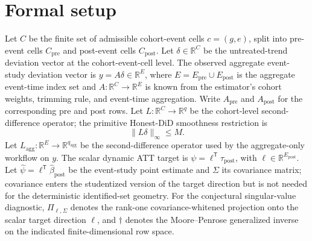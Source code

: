 \documentclass[11pt]{article}
\newcommand{\transpose}{\mathsf{T}}
\newcommand{\R}{\mathbb{R}}
\theoremstyle{definition}
\theoremstyle{plain}
\theoremstyle{remark}
\begin{document}
\section{Formal setup}
Let \(C\) be the finite set of admissible cohort-event cells \(c=(g,e)\), split into pre-event cells \(C_{\mathrm{pre}}\) and post-event cells \(C_{\mathrm{post}}\).
Let \(\delta\in\R^{C}\) be the untreated-trend deviation vector at the cohort-event-cell level.
The observed aggregate event-study deviation vector is \(y=A\delta\in\R^{E}\), where \(E=E_{\mathrm{pre}}\cup E_{\mathrm{post}}\) is the aggregate event-time index set and \(A:\R^C\to\R^E\) is known from the estimator's cohort weights, trimming rule, and event-time aggregation.
Write \(A_{\mathrm{pre}}\) and \(A_{\mathrm{post}}\) for the corresponding pre and post rows.
Let \(L:\R^C\to\R^q\) be the cohort-level second-difference operator; the primitive Honest-DiD smoothness restriction is
\[
  \|L\delta\|_\infty \le M.
\]
Let \(L_{\mathrm{agg}}:\R^E\to\R^{q_{\mathrm{agg}}}\) be the second-difference operator used by the aggregate-only workflow on \(y\).
The scalar dynamic ATT target is \(\psi=\ell^\transpose\tau_{\mathrm{post}}\), with \(\ell\in\R^{E_{\mathrm{post}}}\).
Let \(\hat\psi=\ell^\transpose\hat\beta_{\mathrm{post}}\) be the event-study point estimate and \(\Sigma\) its covariance matrix; covariance enters the studentized version of the target direction but is not needed for the deterministic identified-set geometry.
For the conjectural singular-value diagnostic, \(\Pi_{\ell,\Sigma}\) denotes the rank-one covariance-whitened projection onto the scalar target direction \(\ell\), and \(\dagger\) denotes the Moore--Penrose generalized inverse on the indicated finite-dimensional row space.
\end{document}
